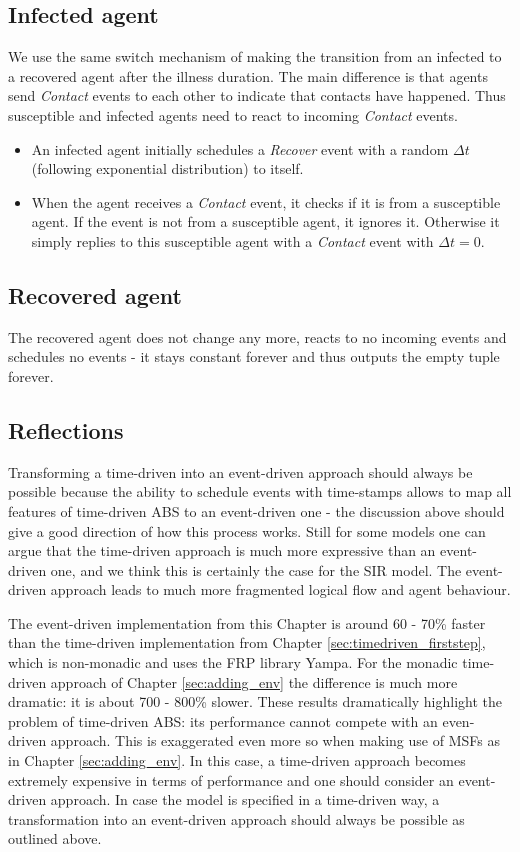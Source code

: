 \subsection{Infected agent}
We use the same switch mechanism of making the transition from an infected to a recovered agent after the illness duration. The main difference is that agents send \textit{Contact} events to each other to indicate that contacts have happened. Thus susceptible and infected agents need to react to incoming \textit{Contact} events.

\begin{itemize}
	\item An infected agent initially schedules a \textit{Recover} event with a random $\Delta t$ (following exponential distribution) to itself.
	\item When the agent receives a \textit{Contact} event, it checks if it is from a susceptible agent. If the event is not from a susceptible agent, it ignores it. Otherwise it simply replies to this susceptible agent with a \textit{Contact} event with $\Delta t = 0$.
\end{itemize}

\subsection{Recovered agent}
The recovered agent does not change any more, reacts to no incoming events and schedules no events - it stays constant forever and thus outputs the empty tuple forever.

\subsection{Reflections}
Transforming a time-driven into an event-driven approach should always be possible because the ability to schedule events with time-stamps allows to map all features of time-driven ABS to an event-driven one - the discussion above should give a good direction of how this process works. Still for some models one can argue that the time-driven approach is much more expressive than an event-driven one, and we think this is certainly the case for the SIR model. The event-driven approach leads to much more fragmented logical flow and agent behaviour.

The event-driven implementation from this Chapter is around 60 - 70\% faster than the time-driven implementation from Chapter \ref{sec:timedriven_firststep}, which is non-monadic and uses the FRP library Yampa. For the monadic time-driven approach of Chapter \ref{sec:adding_env} the difference is much more dramatic: it is about 700 - 800\% slower. These results dramatically highlight the problem of time-driven ABS: its performance cannot compete with an even-driven approach. This is exaggerated even more so when making use of MSFs as in Chapter \ref{sec:adding_env}. In this case, a time-driven approach becomes extremely expensive in terms of performance and one should consider an event-driven approach. In case the model is specified in a time-driven way, a transformation into an event-driven approach should always be possible as outlined above.